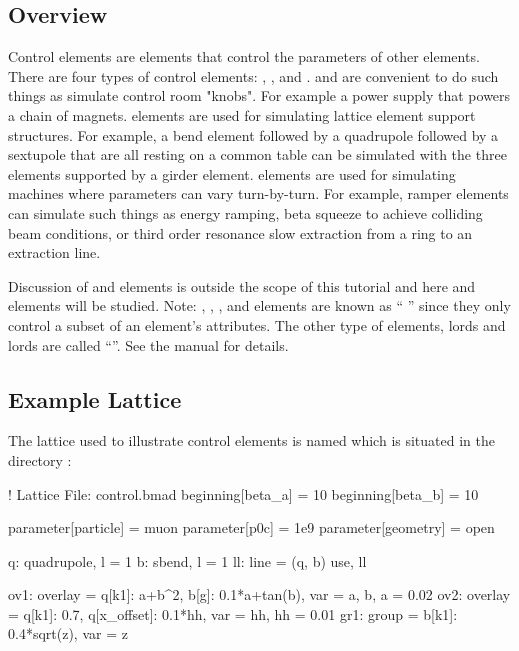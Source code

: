 \documentclass{hitec}     %
\begin{document}
{{{{%
\subsection{Overview}

Control elements are elements that control the parameters of other elements. There are four types
of control elements: , ,  and .  and
 are convenient to do such things as simulate control room "knobs". For example a power
supply that powers a chain of magnets.  elements
are used for simulating lattice element support structures. 
For example, a bend element followed by a quadrupole followed by a sextupole that are all
resting on a common table can be simulated with the three elements supported by a girder element. 
 elements are used for simulating machines where parameters can vary turn-by-turn. For example,
ramper elements can simulate such things as energy ramping, beta squeeze to achieve colliding beam conditions, or
third order resonance slow extraction from a ring to an extraction line.

Discussion of  and  elements is outside the scope of this tutorial and here  and
 elements will be studied.
Note: , , , and  elements are known as `` '' since they
only control a subset of an element's attributes. The other type of  elements,  lords
and  lords are called ``''. See the \bmad manual for details.

\subsection{Example Lattice}

The lattice used to illustrate control elements is named   which is situated in the directory :
\begin{code}
! Lattice File: control.bmad
beginning[beta_a] = 10
beginning[beta_b] = 10

parameter[particle] = muon
parameter[p0c] = 1e9
parameter[geometry] = open

q: quadrupole, l = 1
b: sbend, l = 1
ll: line = (q, b)
use, ll

ov1: overlay = {q[k1]: a+b^2, b[g]: 0.1*a+tan(b)}, var = {a, b}, a = 0.02
ov2: overlay = {q[k1]: 0.7, q[x_offset]: 0.1*hh}, var = {hh}, hh = 0.01
gr1: group = {b[k1]: 0.4*sqrt(z)}, var = {z}
\end{code}

}}}}
\end{document}
